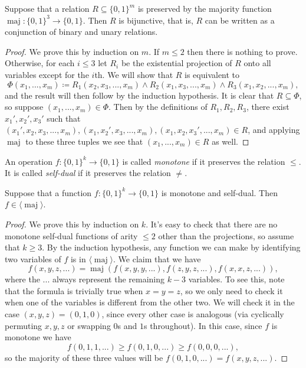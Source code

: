 \documentclass[letterpaper,11pt]{article}
\DeclareMathOperator{\maj}{maj}
\begin{document}
\begin{thm} Suppose that a relation $R \subseteq \{0,1\}^m$ is preserved by the majority function $\operatorname{maj} : \{0,1\}^3 \rightarrow \{0,1\}$. Then $R$ is bijunctive, that is, $R$ can be written as a conjunction of binary and unary relations.
\end{thm}
\begin{proof} We prove this by induction on $m$. If $m \le 2$ then there is nothing to prove. Otherwise, for each $i \le 3$ let $R_i$ be the existential projection of $R$ onto all variables except for the $i$th. We will show that $R$ is equivalent to
\[
\Phi(x_1, ..., x_m) \coloneqq R_1(x_2, x_3, ..., x_m) \wedge R_2(x_1,x_3, ..., x_m) \wedge R_3(x_1,x_2,...,x_m),
\]
and the result will then follow by the induction hypothesis. It is clear that $R \subseteq \Phi$, so suppose $(x_1, ..., x_m) \in \Phi$. Then by the definitions of $R_1, R_2, R_3$, there exist $x_1', x_2', x_3'$ such that $(x_1',x_2,x_3,...,x_m), (x_1,x_2',x_3,...,x_m), (x_1,x_2,x_3',...,x_m) \in R$, and applying $\maj$ to these three tuples we see that $(x_1, ..., x_m) \in R$ as well.
\end{proof}

\begin{defn} An operation $f : \{0,1\}^k \rightarrow \{0,1\}$ is called \emph{monotone} if it preserves the relation $\le$. It is called \emph{self-dual} if it preserves the relation $\ne$.
\end{defn}

\begin{thm} Suppose that a function $f : \{0,1\}^k \rightarrow \{0,1\}$ is monotone and self-dual. Then $f \in \langle \maj \rangle$.
\end{thm}
\begin{proof} We prove this by induction on $k$. It's easy to check that there are no monotone self-dual functions of arity $\le 2$ other than the projections, so assume that $k \ge 3$. By the induction hypothesis, any function we can make by identifying two variables of $f$ is in $\langle \maj \rangle$. We claim that we have
\[
f(x,y,z,...) = \maj(f(x,y,y,...), f(z,y,z,...), f(x,x,z,...)),
\]
where the $...$ always represent the remaining $k-3$ variables. To see this, note that the formula is trivially true when $x=y=z$, so we only need to check it when one of the variables is different from the other two. We will check it in the case $(x,y,z) = (0,1,0)$, since every other case is analogous (via cyclically permuting $x,y,z$ or swapping $0$s and $1$s throughout). In this case, since $f$ is monotone we have
\[
f(0,1,1,...) \ge f(0,1,0, ...) \ge f(0,0,0,...),
\]
so the majority of these three values will be $f(0,1,0,...) = f(x,y,z,...)$.
\end{proof}
\end{document}
